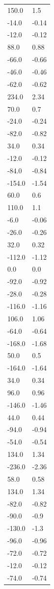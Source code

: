 \begin{longtable}{ll}
150.0 & 1.5 \\
-14.0 & -0.14 \\
-12.0 & -0.12 \\
88.0 & 0.88 \\
-66.0 & -0.66 \\
-46.0 & -0.46 \\
-62.0 & -0.62 \\
234.0 & 2.34 \\
70.0 & 0.7 \\
-24.0 & -0.24 \\
-82.0 & -0.82 \\
34.0 & 0.34 \\
-12.0 & -0.12 \\
-84.0 & -0.84 \\
-154.0 & -1.54 \\
60.0 & 0.6 \\
110.0 & 1.1 \\
-6.0 & -0.06 \\
-26.0 & -0.26 \\
32.0 & 0.32 \\
-112.0 & -1.12 \\
0.0 & 0.0 \\
-92.0 & -0.92 \\
-28.0 & -0.28 \\
-116.0 & -1.16 \\
106.0 & 1.06 \\
-64.0 & -0.64 \\
-168.0 & -1.68 \\
50.0 & 0.5 \\
-164.0 & -1.64 \\
34.0 & 0.34 \\
96.0 & 0.96 \\
-146.0 & -1.46 \\
44.0 & 0.44 \\
-94.0 & -0.94 \\
-54.0 & -0.54 \\
134.0 & 1.34 \\
-236.0 & -2.36 \\
58.0 & 0.58 \\
134.0 & 1.34 \\
-82.0 & -0.82 \\
-90.0 & -0.9 \\
-130.0 & -1.3 \\
-96.0 & -0.96 \\
-72.0 & -0.72 \\
-12.0 & -0.12 \\
-74.0 & -0.74 \\

\end{longtable}
